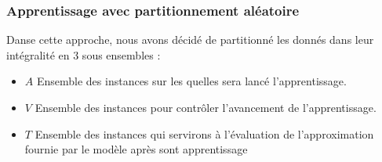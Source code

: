 \subsubsection{Apprentissage avec partitionnement aléatoire}\label{randomPartLearning}
Danse cette approche, nous avons décidé de partitionné les donnés dans leur intégralité en 3 sous ensembles : 
\begin{itemize}
	\item $A$ Ensemble des instances sur les quelles sera lancé l'apprentissage.
	\item $V$ Ensemble des instances pour contrôler l'avancement de l'apprentissage.
	\item $T$ Ensemble des instances qui servirons à l'évaluation de l'approximation fournie par le modèle après sont apprentissage 
\end{itemize}

